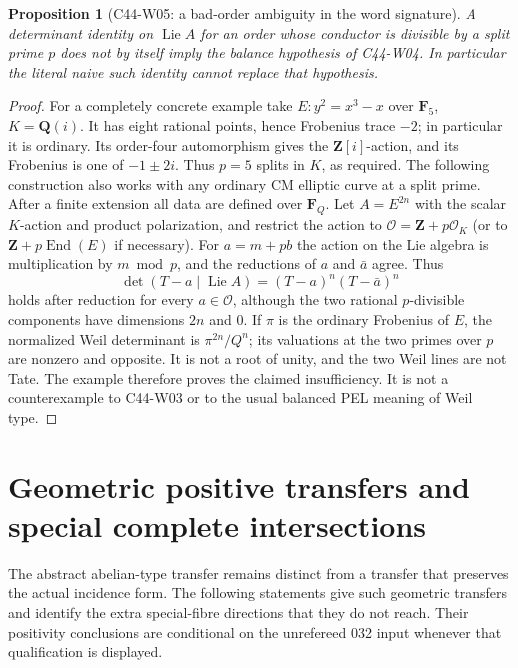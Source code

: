 \documentclass[11pt]{article}
\newtheorem{proposition}[theorem]{Proposition}
\theoremstyle{remark}\newtheorem{remark}[theorem]{Remark}
\begin{document}
\begin{proposition}[C44-W05: a bad-order ambiguity in the word signature]
A determinant identity on $\operatorname{Lie}A$ for an order whose
conductor is divisible by a split prime $p$ does not by itself
imply the balance hypothesis of C44-W04.  In particular the
literal naive such identity cannot replace that hypothesis.
\end{proposition}

\begin{proof}
For a completely concrete example take
$E:y^2=x^3-x$ over $\mathbf F_5$, $K=\mathbf Q(i)$.
It has eight rational points, hence Frobenius trace $-2$;
in particular it is ordinary.  Its order-four automorphism
gives the $\mathbf Z[i]$-action, and its Frobenius is one
of $-1\pm2i$.  Thus $p=5$ splits in $K$, as required.
The following construction also works with any ordinary
CM elliptic curve at a split prime.  After a finite
extension all data are defined over $\mathbf F_Q$.
Let $A=E^{2n}$ with the scalar $K$-action and product polarization,
and restrict the action to $\mathcal O=\mathbf Z+p\mathcal O_K$
(or to $\mathbf Z+p\operatorname{End}(E)$ if necessary).
For $a=m+pb$ the action on the Lie algebra is multiplication by
$m\bmod p$, and the reductions of $a$ and $\bar a$ agree.
Thus
\[
 \det(T-a\mid\operatorname{Lie}A)
 =(T-a)^n(T-\bar a)^n
\]
holds after reduction for every $a\in\mathcal O$, although the
two rational $p$-divisible components have dimensions $2n$ and
$0$.  If $\pi$ is the ordinary Frobenius of $E$, the normalized
Weil determinant is $\pi^{2n}/Q^n$; its valuations at the two
primes over $p$ are nonzero and opposite.  It is not a root of
unity, and the two Weil lines are not Tate.  The example
therefore proves the claimed insufficiency.  It is not a
counterexample to C44-W03 or to the usual balanced PEL meaning
of Weil type.
\end{proof}

\section{Geometric positive transfers and special complete intersections}

The abstract abelian-type transfer remains distinct from a transfer that
preserves the actual incidence form. The following statements give
such geometric transfers and identify the extra special-fibre directions
that they do not reach. Their positivity conclusions are conditional
on the unrefereed 032 input whenever that qualification is displayed.
\end{document}
